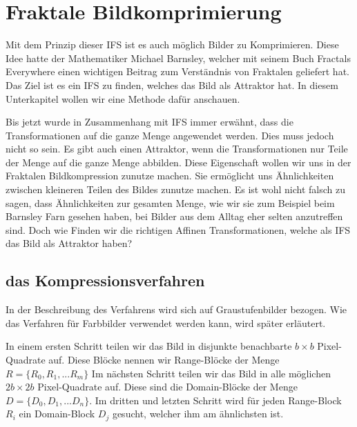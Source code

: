 %
%
%
\section{Fraktale Bildkomprimierung
\label{ifs:section:teil3}}
Mit dem Prinzip dieser IFS ist es auch möglich Bilder zu Komprimieren.
Diese Idee hatte der Mathematiker Michael Barnsley, welcher mit seinem Buch Fractals Everywhere einen wichtigen Beitrag zum Verständnis von Fraktalen geliefert hat.
Das Ziel ist es ein IFS zu finden, welches das Bild als Attraktor hat.
In diesem Unterkapitel wollen wir eine Methode dafür anschauen.\cite{ifs:Rousseau2012}


Bis jetzt wurde in Zusammenhang mit IFS immer erwähnt, dass die Transformationen auf die ganze Menge angewendet werden.
Dies muss jedoch nicht so sein. 
Es gibt auch einen Attraktor, wenn die Transformationen nur Teile der Menge auf die ganze Menge abbilden.
Diese Eigenschaft wollen wir uns in der Fraktalen Bildkompression zunutze machen.
Sie ermöglicht uns Ähnlichkeiten zwischen kleineren Teilen des Bildes zunutze machen.
Es ist wohl nicht falsch zu sagen, dass Ähnlichkeiten zur gesamten Menge, wie wir sie zum Beispiel beim Barnsley Farn gesehen haben, bei Bilder aus dem Alltag eher selten anzutreffen sind.
Doch wie Finden wir die richtigen Affinen Transformationen, welche als IFS das Bild als Attraktor haben?

\subsection{das Kompressionsverfahren
\label{ifs:subsection:malorum}}
In der Beschreibung des Verfahrens wird sich auf Graustufenbilder bezogen. Wie das Verfahren für Farbbilder verwendet werden kann, wird später erläutert.

In einem ersten Schritt teilen wir das Bild in disjunkte benachbarte $b \times b$ Pixel-Quadrate auf. Diese Blöcke nennen wir Range-Blöcke der Menge $R=\{R_0,R_1,...R_m\}$
Im nächsten Schritt teilen wir das Bild in alle möglichen $2b \times 2b$ Pixel-Quadrate auf. Diese sind die Domain-Blöcke der Menge $D = \{D_0,D_1,...D_n\}$. 
Im dritten und letzten Schritt wird für jeden Range-Block $R_i$ ein Domain-Block $D_j$ gesucht, welcher ihm am ähnlichsten ist.

